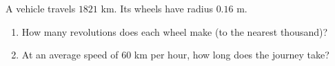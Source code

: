 A vehicle travels $1821$ km. Its wheels have radius $0.16$ m.
\begin{enumerate}
\item[(a)] How many revolutions does each wheel make (to the nearest thousand)?
\item[(b)] At an average speed of $60$ km per hour, how long does the journey take?
\end{enumerate}
